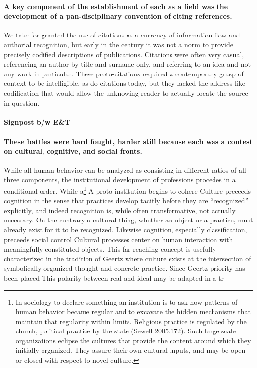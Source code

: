 \documentclass[]{article}
\let\rmarkdownfootnote\footnote%
\def\footnote{\protect\rmarkdownfootnote}
\begin{document}
\paragraph{A key component of the establishment of each as a field was
the development of a pan-disciplinary convention of citing
references.}\label{a-key-component-of-the-establishment-of-each-as-a-field-was-the-development-of-a-pan-disciplinary-convention-of-citing-references.}

We take for granted the use of citations as a currency of information
flow and authorial recognition, but early in the century it was not a
norm to provide precisely codified descriptions of publications.
Citations were often very casual, referencing an author by title and
surname only, and referring to an idea and not any work in particular.
These proto-citations required a contemporary grasp of context to be
intelligible, as do citations today, but they lacked the address-like
codification that would allow the unknowing reader to actually locate
the source in question.

\paragraph{Signpost b/w E\&T}\label{signpost-bw-et}

\paragraph{These battles were hard fought, harder still because each was
a contest on cultural, cognitive, and social
fronts.}\label{these-battles-were-hard-fought-harder-still-because-each-was-a-contest-on-cultural-cognitive-and-social-fronts.}

While all human behavior can be analyzed as consisting in different
ratios of all three components, the institutional development of
professions procedes in a conditional order. While a\footnote{In
  sociology to declare something an institution is to ask how patterns
  of human behavior became regular and to excavate the hidden mechanisms
  that maintain that regularity within limits. Religious practice is
  regulated by the church, political practice by the state (Sewell
  2005:172). Such large scale organizations eclipse the cultures that
  provide the content around which they initially organized. They assure
  their own cultural inputs, and may be open or closed with respect to
  novel culture.} A proto-institution begins to cohere Culture preceeds
cognition in the sense that practices develop tacitly before they are
``recognized'' explicitly, and indeed recognition is, while often
transformative, not actually necessary. On the contrary a cultural
thing, whether an object or a practice, must already exist for it to be
recognized. Likewise cognition, especially classification, preceeds
social control Cultural processes center on human interaction with
meaningfully constituted objects. This far reaching concept is usefully
characterized in the tradition of Geertz where culture exists at the
intersection of symbolically organized thought and concrete practice.
Since Geertz priority has been placed This polarity between real and
ideal may be adapted in a tr
\end{document}
